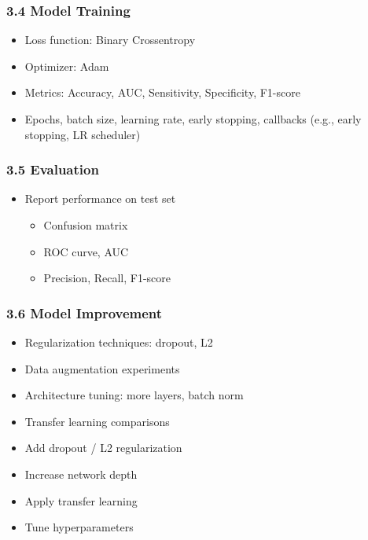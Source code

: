 \documentclass[
  12pt,
  letterpaper,
  DIV=11,
  numbers=noendperiod]{scrartcl}
\providecommand{\tightlist}{%
  \setlength{\itemsep}{0pt}\setlength{\parskip}{0pt}}
\begin{document}
\subsubsection{3.4 Model Training}\label{model-training}

\begin{itemize}
\tightlist
\item
  Loss function: Binary Crossentropy
\item
  Optimizer: Adam
\item
  Metrics: Accuracy, AUC, Sensitivity, Specificity, F1-score
\item
  Epochs, batch size, learning rate, early stopping, callbacks (e.g.,
  early stopping, LR scheduler)
\end{itemize}

\subsubsection{3.5 Evaluation}\label{evaluation}

\begin{itemize}
\tightlist
\item
  Report performance on test set

  \begin{itemize}
  \tightlist
  \item
    Confusion matrix
  \item
    ROC curve, AUC
  \item
    Precision, Recall, F1-score
  \end{itemize}
\end{itemize}

\subsubsection{3.6 Model Improvement}\label{model-improvement}

\begin{itemize}
\item
  Regularization techniques: dropout, L2
\item
  Data augmentation experiments
\item
  Architecture tuning: more layers, batch norm\\
\item
  Transfer learning comparisons
\item
  Add dropout / L2 regularization
\item
  Increase network depth
\item
  Apply transfer learning
\item
  Tune hyperparameters
\end{itemize}
\end{document}
